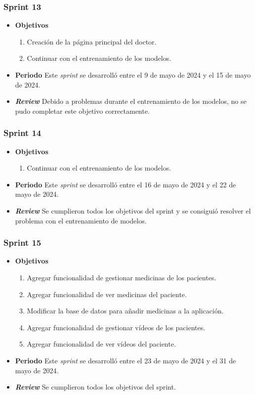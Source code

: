 \subsubsection{Sprint 13}
\begin{itemize}
\item \textbf{Objetivos}
\begin{enumerate}
\item Creación de la página principal del doctor.
\item Continuar con el entrenamiento de los modelos.
\end{enumerate}
\item \textbf{Periodo}
Este \textsl{sprint} se desarrolló entre el 9 de mayo de 2024 y el 15 de mayo de 2024.
\item \textbf{\textsl{Review}}
Debido a problemas durante el entrenamiento de los modelos, no se pudo completar este objetivo correctamente. 
\end{itemize}

\subsubsection{Sprint 14}
\begin{itemize}
\item \textbf{Objetivos}
\begin{enumerate}
\item Continuar con el entrenamiento de los modelos.
\end{enumerate}
\item \textbf{Periodo}
Este \textsl{sprint} se desarrolló entre el 16 de mayo de 2024 y el 22 de mayo de 2024.
\item \textbf{\textsl{Review}}
Se cumplieron todos los objetivos del sprint y se consiguió resolver el problema con el entrenamiento de modelos.
\end{itemize}

\subsubsection{Sprint 15}
\begin{itemize}
\item \textbf{Objetivos}
\begin{enumerate}
\item Agregar funcionalidad de gestionar medicinas de los pacientes.
\item Agregar funcionalidad de ver medicinas del paciente.
\item Modificar la base de datos para añadir medicinas a la aplicación.
\item Agregar funcionalidad de gestionar vídeos de los pacientes.
\item Agregar funcionalidad de ver vídeos del paciente.
\end{enumerate}
\item \textbf{Periodo}
Este \textsl{sprint} se desarrolló entre el 23 de mayo de 2024 y el 31 de mayo de 2024.
\item \textbf{\textsl{Review}}
Se cumplieron todos los objetivos del sprint.
\end{itemize}

